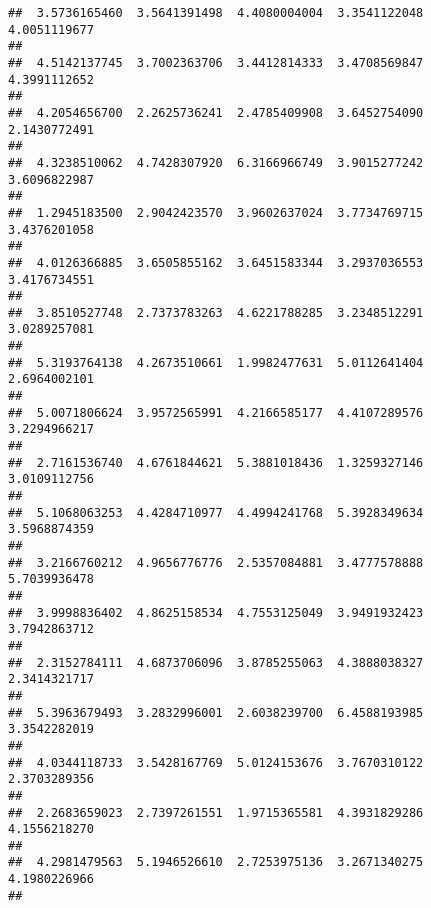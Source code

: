 \documentclass[]{article}
\begin{document}
\begin{verbatim}
##  3.5736165460  3.5641391498  4.4080004004  3.3541122048  4.0051119677 
##                                                                       
##  4.5142137745  3.7002363706  3.4412814333  3.4708569847  4.3991112652 
##                                                                       
##  4.2054656700  2.2625736241  2.4785409908  3.6452754090  2.1430772491 
##                                                                       
##  4.3238510062  4.7428307920  6.3166966749  3.9015277242  3.6096822987 
##                                                                       
##  1.2945183500  2.9042423570  3.9602637024  3.7734769715  3.4376201058 
##                                                                       
##  4.0126366885  3.6505855162  3.6451583344  3.2937036553  3.4176734551 
##                                                                       
##  3.8510527748  2.7373783263  4.6221788285  3.2348512291  3.0289257081 
##                                                                       
##  5.3193764138  4.2673510661  1.9982477631  5.0112641404  2.6964002101 
##                                                                       
##  5.0071806624  3.9572565991  4.2166585177  4.4107289576  3.2294966217 
##                                                                       
##  2.7161536740  4.6761844621  5.3881018436  1.3259327146  3.0109112756 
##                                                                       
##  5.1068063253  4.4284710977  4.4994241768  5.3928349634  3.5968874359 
##                                                                       
##  3.2166760212  4.9656776776  2.5357084881  3.4777578888  5.7039936478 
##                                                                       
##  3.9998836402  4.8625158534  4.7553125049  3.9491932423  3.7942863712 
##                                                                       
##  2.3152784111  4.6873706096  3.8785255063  4.3888038327  2.3414321717 
##                                                                       
##  5.3963679493  3.2832996001  2.6038239700  6.4588193985  3.3542282019 
##                                                                       
##  4.0344118733  3.5428167769  5.0124153676  3.7670310122  2.3703289356 
##                                                                       
##  2.2683659023  2.7397261551  1.9715365581  4.3931829286  4.1556218270 
##                                                                       
##  4.2981479563  5.1946526610  2.7253975136  3.2671340275  4.1980226966 
##                                                                       

\end{verbatim}
\end{document}
